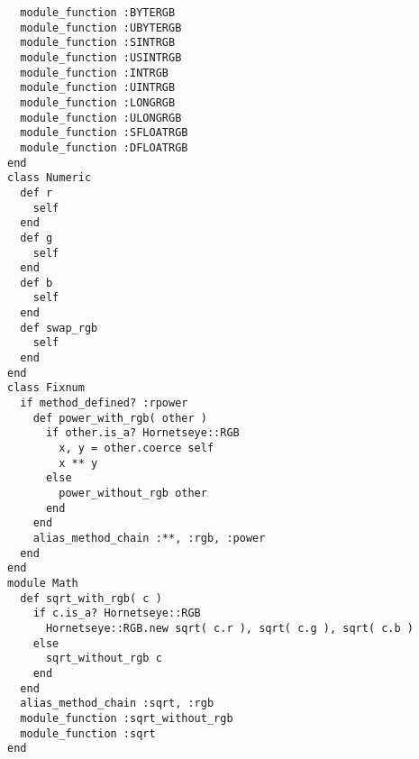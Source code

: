 \begin{lstlisting}
  module_function :BYTERGB
  module_function :UBYTERGB
  module_function :SINTRGB
  module_function :USINTRGB
  module_function :INTRGB
  module_function :UINTRGB
  module_function :LONGRGB
  module_function :ULONGRGB
  module_function :SFLOATRGB
  module_function :DFLOATRGB
end
class Numeric
  def r
    self
  end
  def g
    self
  end
  def b
    self
  end
  def swap_rgb
    self
  end
end
class Fixnum
  if method_defined? :rpower
    def power_with_rgb( other )
      if other.is_a? Hornetseye::RGB
        x, y = other.coerce self
        x ** y
      else
        power_without_rgb other
      end
    end
    alias_method_chain :**, :rgb, :power
  end
end
module Math
  def sqrt_with_rgb( c )
    if c.is_a? Hornetseye::RGB
      Hornetseye::RGB.new sqrt( c.r ), sqrt( c.g ), sqrt( c.b )
    else
      sqrt_without_rgb c
    end
  end
  alias_method_chain :sqrt, :rgb
  module_function :sqrt_without_rgb
  module_function :sqrt
end
\end{lstlisting}

